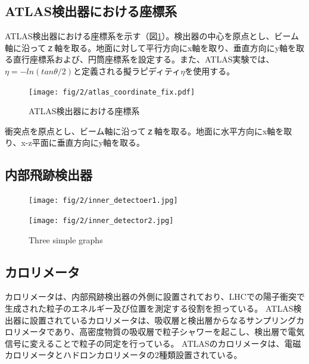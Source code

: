 \subsection{ATLAS検出器における座標系}
ATLAS検出器における座標系を示す（図\ref{fig:a}）。検出器の中心を原点とし、ビーム軸に沿ってｚ軸を取る。地面に対して平行方向にx軸を取り、垂直方向にy軸を取る直行座標系および、円筒座標系を設定する。また、ATLAS実験では、$\eta=-ln(tan\theta/2)$と定義される擬ラピディティ$\eta$を使用する。

\begin{figure}[tb]
  \centering
  \texttt{[image: fig/2/atlas\_coordinate\_fix.pdf]}
  \caption{ATLAS検出器における座標系}
  \label{fig:a}
\end{figure}

衝突点を原点とし、ビーム軸に沿ってｚ軸を取る。地面に水平方向にx軸を取り、x-z平面に垂直方向にy軸を取る。

\subsection{内部飛跡検出器}

\begin{figure}
    \centering
    \begin{minipage}[b]{0.3\linewidth}
        \centering
        \texttt{[image: fig/2/inner\_detectoer1.jpg]}
        \vspace{10pt}
        \label{fig:内部飛跡検出器の概略図1}
    \end{minipage}
    \hfill
    \begin{minipage}[b]{0.5\linewidth}
        \centering
        \texttt{[image: fig/2/inner\_detector2.jpg]}
        \vspace{10pt}
        \label{fig:内部飛跡検出器の概略図2}
    \end{minipage}
    \caption{Three simple graphs}
    \label{fig:three graphs}
\end{figure}



\subsection{カロリメータ}
カロリメータは、内部飛跡検出器の外側に設置されており、LHCでの陽子衝突で生成された粒子のエネルギー及び位置を測定する役割を担っている。
ATLAS検出器に設置されているカロリメータは、吸収層と検出層からなるサンプリングカロリメータであり、高密度物質の吸収層で粒子シャワーを起こし、検出層で電気信号に変えることで粒子の同定を行っている。
ATLASのカロリメータは、電磁カロリメータとハドロンカロリメータの2種類設置されている。

